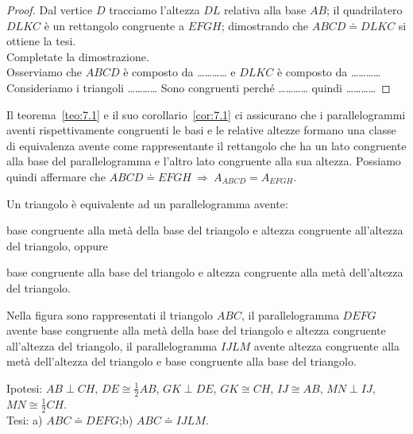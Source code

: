 \noindent\begin{minipage}{0.65\textwidth}\parindent15pt
\begin{proof}
Dal vertice $D$ tracciamo l'altezza $DL$ relativa alla base $AB$; il 
quadrilatero $DLKC$ è un rettangolo congruente a $EFGH$; dimostrando 
che $ABCD\doteq DLKC$ si ottiene la tesi.\\
Completate la dimostrazione.\\
Osserviamo che $ABCD$ è composto da \ldots\ldots\ldots\ldots{}
e $DLKC$ è composto da \ldots\ldots\ldots\ldots{} 
Consideriamo i triangoli \ldots\ldots\ldots\ldots{}
Sono congruenti perché \ldots\ldots\ldots\ldots{}
quindi \ldots\ldots\ldots\ldots{}
\end{proof}
\end{minipage}\hfil
\begin{minipage}{0.35\textwidth}
	\centering
\end{minipage}\vspace{5pt}

Il teorema~\ref{teo:7.1} e il suo corollario~\ref{cor:7.1} ci 
assicurano che i parallelogrammi aventi rispettivamente congruenti le 
basi e le relative altezze formano una classe di equivalenza avente 
come rappresentante il rettangolo che ha un lato congruente alla base 
del parallelogramma e l'altro lato congruente alla sua altezza. 
Possiamo quindi affermare che $ABCD\doteq EFGH \:\Rightarrow\: 
A_{ABCD} = A_{EFGH}$.

\begin{teorema}\label{teo:7.2}
Un triangolo è equivalente ad un parallelogramma avente:
\begin{enumeratea}
\item base congruente alla metà della base del triangolo e altezza 
congruente all'altezza del triangolo, oppure
\item base congruente alla base del triangolo e altezza congruente 
alla metà dell'altezza del triangolo.
\end{enumeratea}
\end{teorema}

Nella figura sono rappresentati il triangolo $ABC$, il 
parallelogramma $DEFG$ avente base congruente alla metà della base del 
triangolo e altezza congruente all'altezza del triangolo, il 
parallelogramma $IJLM$ avente altezza congruente alla metà 
dell'altezza del triangolo e base congruente alla base del triangolo.

\noindent Ipotesi: $AB\perp CH$, $DE\cong \frac{1}{2}AB$, $GK\perp 
DE$, $GK\cong CH$, $IJ\cong AB$, $MN\perp IJ$, $MN\cong 
\frac{1}{2}CH$.\\
Tesi: a) $ABC\doteq DEFG$;\quad b) $ABC\doteq IJLM$.

